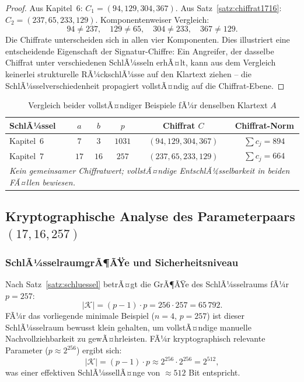﻿\documentclass[a4paper,12pt]{scrreprt}
\theoremstyle{definition}
\begin{document}
\begin{proof}
Aus Kapitel~6: $C_1 = (94, 129, 304, 367)$. Aus Satz~\ref{satz:chiffrat1716}: $C_2 = (237, 65, 233, 129)$. Komponentenweiser Vergleich:
\[
94 \neq 237, \quad 129 \neq 65, \quad 304 \neq 233, \quad 367 \neq 129.
\]
Die Chiffrate unterscheiden sich in allen vier Komponenten. Dies illustriert eine entscheidende Eigenschaft der Signatur-Chiffre: Ein Angreifer, der dasselbe Chiffrat unter verschiedenen SchlÃ¼sseln erhÃ¤lt, kann aus dem Vergleich keinerlei strukturelle RÃ¼ckschlÃ¼sse auf den Klartext ziehen -- die SchlÃ¼sselverschiedenheit propagiert vollstÃ¤ndig auf die Chiffrat-Ebene.
\end{proof}

\begin{table}[H]
\centering
\caption{Vergleich beider vollstÃ¤ndiger Beispiele fÃ¼r denselben Klartext $A$}
\label{tab:vergleich}
\begin{tabular}{@{}lccccc@{}}
\toprule
\textbf{SchlÃ¼ssel} & $a$ & $b$ & $p$ & \textbf{Chiffrat $C$} & \textbf{Chiffrat-Norm} \\
\midrule
Kapitel~6 & $7$  & $3$  & $1031$ & $(94, 129, 304, 367)$ & $\sum c_j = 894$  \\
Kapitel~7 & $17$ & $16$ & $257$  & $(237, 65, 233, 129)$ & $\sum c_j = 664$  \\
\midrule
\multicolumn{6}{l}{\emph{Kein gemeinsamer Chiffratwert; vollstÃ¤ndige EntschlÃ¼sselbarkeit in beiden FÃ¤llen bewiesen.}} \\
\bottomrule
\end{tabular}
\end{table}

\subsection{Kryptographische Analyse des Parameterpaars $(17, 16, 257)$}

\subsubsection{SchlÃ¼sselraumgrÃ¶ÃŸe und Sicherheitsniveau}

Nach Satz~\ref{satz:schluessel} betrÃ¤gt die GrÃ¶ÃŸe des SchlÃ¼sselraums fÃ¼r $p = 257$:
\[
|\mathcal{K}| = (p-1) \cdot p = 256 \cdot 257 = 65\,792.
\]
FÃ¼r das vorliegende minimale Beispiel ($n=4$, $p=257$) ist dieser SchlÃ¼sselraum bewusst klein gehalten, um vollstÃ¤ndige manuelle Nachvollziehbarkeit zu gewÃ¤hrleisten. FÃ¼r kryptographisch relevante Parameter ($p \approx 2^{256}$) ergibt sich:
\[
|\mathcal{K}| = (p-1) \cdot p \approx 2^{256} \cdot 2^{256} = 2^{512},
\]
was einer effektiven SchlÃ¼ssellÃ¤nge von $\approx 512$ Bit entspricht.
\end{document}
